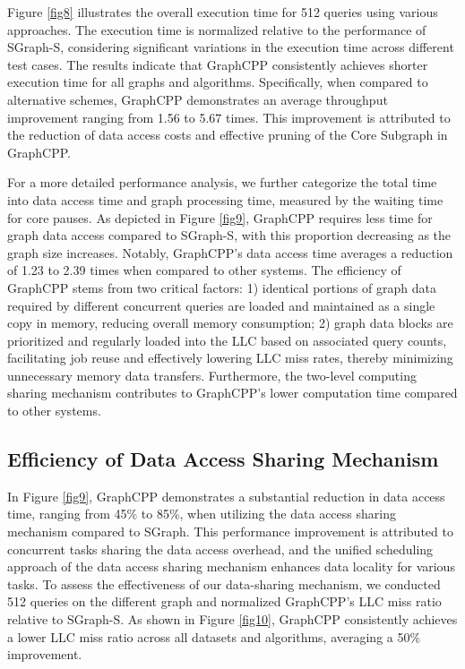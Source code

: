 \documentclass[10pt,journal,compsoc]{IEEEtran}
\begin{document}
Figure \ref{fig8} illustrates the overall execution time for 512 queries using various approaches. The execution time is normalized relative to the performance of SGraph-S, considering significant variations in the execution time across different test cases. The results indicate that GraphCPP consistently achieves shorter execution time for all graphs and algorithms. Specifically, when compared to alternative schemes, GraphCPP demonstrates an average throughput improvement ranging from 1.56 to 5.67 times. This improvement is attributed to the reduction of data access costs and effective pruning of the Core Subgraph in GraphCPP.


For a more detailed performance analysis, we further categorize the total time into data access time and graph processing time, measured by the waiting time for core pauses. As depicted in Figure \ref{fig9}, GraphCPP requires less time for graph data access compared to SGraph-S, with this proportion decreasing as the graph size increases. Notably, GraphCPP's data access time averages a reduction of 1.23 to 2.39 times when compared to other systems. The efficiency of GraphCPP stems from two critical factors: 1) identical portions of graph data required by different concurrent queries are loaded and maintained as a single copy in memory, reducing overall memory consumption; 2) graph data blocks are prioritized and regularly loaded into the LLC based on associated query counts, facilitating job reuse and effectively lowering LLC miss rates, thereby minimizing unnecessary memory data transfers. Furthermore, the two-level computing sharing mechanism contributes to GraphCPP's lower computation time compared to other systems.



\vspace{-10pt}
\subsection{Efficiency of Data Access Sharing Mechanism}
\vspace{-2pt}
In Figure \ref{fig9}, GraphCPP demonstrates a substantial reduction in data access time, ranging from 45\% to 85\%, when utilizing the data access sharing mechanism compared to SGraph. This performance improvement is attributed to concurrent tasks sharing the data access overhead, and the unified scheduling approach of the data access sharing mechanism enhances data locality for various tasks. To assess the effectiveness of our data-sharing mechanism, we conducted 512 queries on the different graph and normalized GraphCPP's LLC miss ratio relative to SGraph-S. As shown in Figure \ref{fig10}, GraphCPP consistently achieves a lower LLC miss ratio across all datasets and algorithms, averaging a 50\% improvement.
\end{document}
